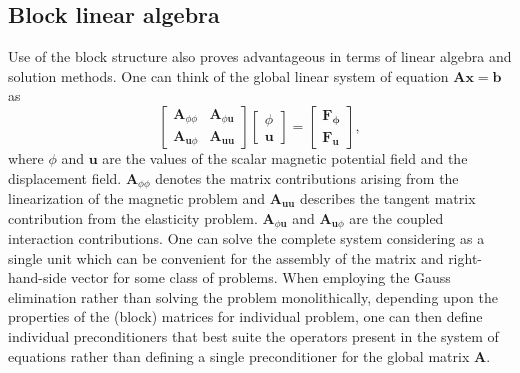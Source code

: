 \subsection{\textbf{Block linear algebra}} Use of the block structure also proves advantageous in terms of linear algebra and solution methods. One can think of the global linear system of equation $\mathbf{A}\mathbf{x} = \mathbf{b}$ as
\begin{equation*}
\begin{bmatrix}
\mathbf{A}_{\phi\phi} & \mathbf{A}_{\phi \mathbf{u}} \\
\mathbf{A}_{\mathbf{u} \phi} & \mathbf{A}_{\mathbf{u}\mathbf{u}} 
\end{bmatrix}
\begin{bmatrix}
\phi \\
\mathbf{u}
\end{bmatrix} 
= 
\begin{bmatrix}
\mathbf{F_{\phi}} \\
\mathbf{F_{\mathbf{u}}}
\end{bmatrix},
\end{equation*}
where $\phi$ and $\mathbf{u}$ are the values of the scalar magnetic potential field and the displacement field. $\mathbf{A}_{\phi\phi}$ denotes the matrix contributions arising from the linearization of the magnetic problem and $\mathbf{A}_{\mathbf{u}\mathbf{u}}$ describes the tangent matrix contribution from the elasticity problem. $\mathbf{A}_{\phi \mathbf{u}}$ and $\mathbf{A}_{\mathbf{u} \phi}$ are the coupled interaction contributions. One can solve the complete system considering as a single unit which can be convenient for the assembly of the matrix and right-hand-side vector for some class of problems. When employing the Gauss elimination rather than solving the problem monolithically, depending upon the properties of the (block) matrices for individual problem, one can then define individual preconditioners that best suite the operators present in the system of equations rather than defining a single preconditioner for the global matrix $\mathbf{A}$.
